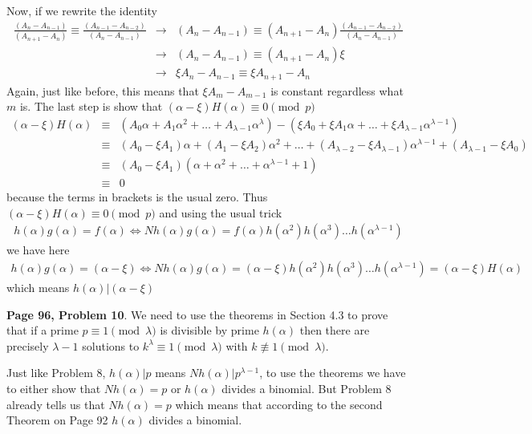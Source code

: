 \documentclass[aps,preprint,preprintnumbers,nofootinbib,showpacs,prd]{revtex4-1}
\newcommand{\nbea}{\begin{eqnarray*}}
\newcommand{\neea}{\end{eqnarray*}}
\begin{document}
Now, if we rewrite the identity
%
\nbea
\frac{(A_n - A_{n - 1})}{(A_{n + 1} - A_n)} \equiv \frac{(A_{n - 1} - A_{n - 2})}{(A_n - A_{n - 1})} & \to & (A_n - A_{n - 1}) \equiv (A_{n + 1} - A_n) \frac{(A_{n - 1} - A_{n - 2})}{(A_n - A_{n - 1})} \\
& \to & (A_n - A_{n - 1}) \equiv (A_{n + 1} - A_n) \xi \\
& \to & \xi A_n - A_{n - 1} \equiv \xi A_{n + 1} - A_n
\neea
%
Again, just like before, this means that $\xi A_{m} - A_{m - 1}$ is constant regardless what $m$ is. The last step is show that $(\alpha - \xi) H(\alpha) \equiv 0 \pmod{p}$
%
\nbea
(\alpha - \xi) H(\alpha) & \equiv & (A_0 \alpha + A_1 \alpha^2 + \dots + A_{\lambda - 1}\alpha^\lambda) - (\xi A_0 + \xi A_1 \alpha + \dots + \xi A_{\lambda - 1} \alpha^{\lambda - 1}) \\
& \equiv & (A_0 - \xi A_1)\alpha + (A_1 - \xi A_2) \alpha^2 + \dots + (A_{\lambda - 2} - \xi A_{\lambda - 1}) \alpha^{\lambda - 1} + (A_{\lambda - 1} - \xi A_0) \\
& \equiv & (A_0 - \xi A_1) (\alpha + \alpha^2 + \dots + \alpha^{\lambda - 1} + 1) \\
& \equiv & 0
\neea
%
because the terms in brackets is the usual zero. Thus $(\alpha - \xi) H(\alpha) \equiv 0 \pmod{p}$ and using the usual trick
%
\nbea
h(\alpha) g(\alpha) = f(\alpha) \Longleftrightarrow Nh(\alpha) g(\alpha) = f(\alpha) h(\alpha^2) h(\alpha^3) \dots h(\alpha^{\lambda - 1})
\neea
%
we have here
%
\nbea
h(\alpha) g(\alpha) = (\alpha - \xi) \Longleftrightarrow Nh(\alpha) g(\alpha) = (\alpha - \xi) h(\alpha^2) h(\alpha^3) \dots h(\alpha^{\lambda - 1}) = (\alpha - \xi) H(\alpha)
\neea
%
which means $h(\alpha)|(\alpha - \xi)$

{\bf Page 96, Problem 10}. We need to use the theorems in Section 4.3 to prove that if a prime $p \equiv 1 \pmod{\lambda}$ is divisible by prime $h(\alpha)$ then there are precisely $\lambda - 1$ solutions to $k^\lambda \equiv 1\pmod{\lambda}$ with $k\not\equiv1\pmod{\lambda}$.

Just like Problem 8, $h(\alpha)|p$ means $Nh(\alpha)|p^{\lambda-1}$, to use the theorems we have to either show that $Nh(\alpha) = p$ or $h(\alpha)$ divides a binomial. But Problem 8 already tells us that $Nh(\alpha) = p$ which means that according to the second Theorem on Page 92 $h(\alpha)$ divides a binomial.
\end{document}

